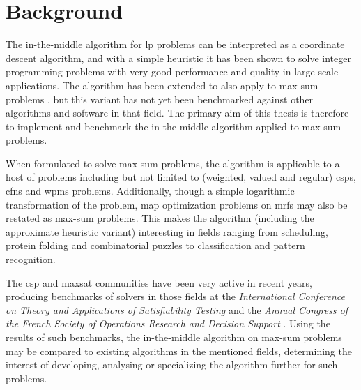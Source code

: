 \section{Background}
The in-the-middle algorithm \parencite{Wedelin95} for \gls{lp} problems can be interpreted as a coordinate descent algorithm, and with a simple heuristic it has been shown to solve integer programming problems with very good performance and quality in large scale applications.
The algorithm has been extended to also apply to max-sum problems \parencites{Wedelin08}{Wedelin13}, but this variant has not yet been benchmarked against other algorithms and software in that field.
The primary aim of this thesis is therefore to implement and benchmark the in-the-middle algorithm applied to max-sum problems.

When formulated to solve max-sum problems, the algorithm is applicable to a host of problems including but not limited to (weighted, valued and regular) \glspl{csp}, \glspl{cfn} and \gls{wpms} problems.
Additionally, though a simple logarithmic transformation of the problem, \gls{map} optimization problems on \glspl{mrf} may also be restated as max-sum problems.
This makes the algorithm (including the approximate heuristic variant) interesting in fields ranging from scheduling, protein folding and combinatorial puzzles to classification and pattern recognition.

The \gls{csp} and \gls{maxsat} communities have been very active in recent years, producing benchmarks of solvers in those fields at the \emph{International Conference on Theory and Applications of Satisfiability Testing} \parencite{Argelich11} and the \emph{Annual Congress of the French Society of Operations Research and Decision Support} \parencite{Allouche14b}.
Using the results of such benchmarks, the in-the-middle algorithm on max-sum problems may be compared to existing algorithms in the mentioned fields, determining the interest of developing, analysing or specializing the algorithm further for such problems.
